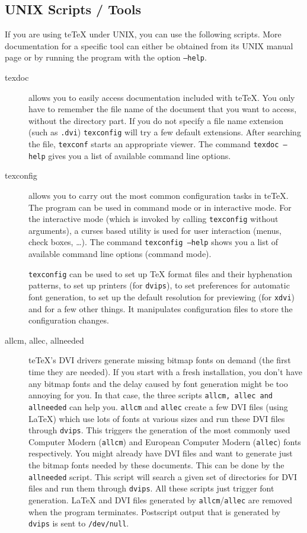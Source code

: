 \documentclass[11pt,a4paper]{article}
\newcommand{\teTeX}{\textrm{te}\TeX\xspace}
\begin{document}
\subsection{UNIX Scripts / Tools}

If you are using \teTeX{} under UNIX, you can use the following
scripts. More documentation for a specific tool can either be obtained
from its UNIX manual page or by running the program with the option
\texttt{--help}. 
\begin{description}
\item[texdoc] allows you to easily access documentation included with
  \teTeX. You only have to remember the file name of the document that
  you want to access, without the directory part. If you do not
  specify a file name extension (such as \texttt{.dvi})
  \texttt{texconfig} will try a few default extensions. After
  searching the file, \texttt{texconf} starts an appropriate viewer.
  The command \texttt{texdoc~--help} gives you a list of available
  command line options.
\item[texconfig] allows you to carry out the most common configuration
  tasks in \teTeX. The program can be used in command mode or in
  interactive mode. For the interactive mode (which is invoked by
  calling \texttt{texconfig} without arguments), a curses based
  utility is used for user interaction (menus, check boxes, \ldots).
  The command \texttt{texconfig --help} shows you a list of available
  command line options (command mode).
  
  \verb+texconfig+ can be used to set up \TeX{} format files and their
  hyphenation patterns, to set up printers (for \verb+dvips+), to set
  preferences for automatic font generation, to set up the default
  resolution for previewing (for \verb+xdvi+) and for a few other
  things.  It manipulates configuration files to store the
  configuration changes.
\item[allcm, allec, allneeded] \teTeX's DVI drivers generate missing
  bitmap fonts on demand (the first time they are needed). If you
  start with a fresh installation, you don't have any bitmap fonts and
  the delay caused by font generation might be too annoying for you.
  In that case, the three scripts \texttt{allcm, allec and allneeded}
  can help you. \texttt{allcm} and \texttt{allec} create a few DVI
  files (using \LaTeX) which use lots of fonts at various sizes and run
  these DVI files through \texttt{dvips}. This triggers the generation
  of the most commonly used Computer Modern (\texttt{allcm}) and
  European Computer Modern (\texttt{allec}) fonts respectively. You
  might already have DVI files and want to generate just the bitmap
  fonts needed by these documents. This can be done by the
  \texttt{allneeded} script.  This script will search a given set of
  directories for DVI files and run them through \texttt{dvips}. All
  these scripts just trigger font generation. \LaTeX{} and DVI files
  generated by \texttt{allcm}/\texttt{allec} are removed when the
  program terminates. Postscript output that is generated by
  \texttt{dvips} is sent to \texttt{/dev/null}.
  

\end{description}
\end{document}
